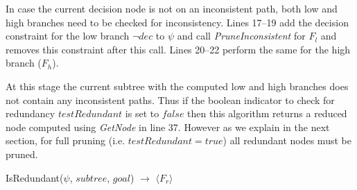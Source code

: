 \documentclass[twoside,11pt]{article}
\begin{document}
In case the current decision node is not on an inconsistent path, both low and high branches need to be checked for inconsistency. Lines 17--19 add the decision constraint for the low branch $\neg \mathit{dec}$ to $\psi$ and call \emph{PruneInconsistent} for $F_l$ and removes this constraint after this call. Lines 20--22 perform the same for the high branch ($F_h$). 

At this stage the current subtree with the computed low and high branches does not contain any inconsistent paths. Thus if the boolean indicator to check for redundancy $\mathit{testRedundant}$ is set to $\mathit{false}$ then this algorithm returns a reduced node computed using \emph{GetNode} in line 37. However as we explain in the next section, for full pruning (i.e. $\mathit{testRedundant}= \mathit{true}$) all redundant nodes must be pruned.
\incmargin{.5em}
\linesnumbered
\begin{algorithm}[t!]
\dontprintsemicolon
\BlankLine
{}
\caption{{\sc IsRedundant}($\psi$, $\mathit{subtree}$, $\mathit{goal}$) $\longrightarrow$ $\langle F_r \rangle$ \label{algRedundant}}
\end{algorithm}
\end{document}
